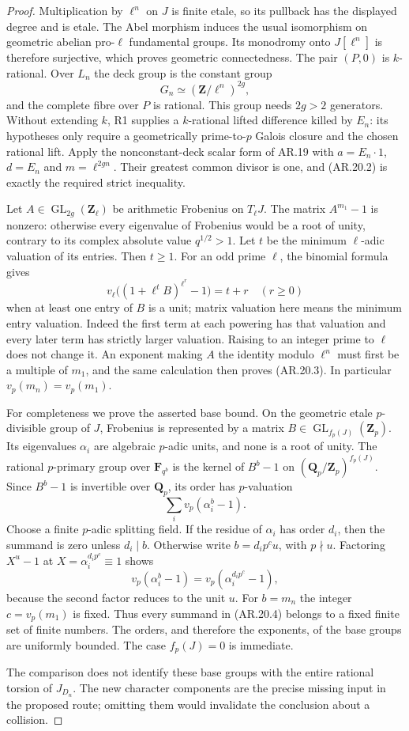\begin{proof}
Multiplication by $\ell^n$ on $J$ is finite etale,
so its pullback has the displayed degree and is etale.
The Abel morphism induces the usual isomorphism on
geometric abelian pro-$\ell$ fundamental groups.
Its monodromy onto $J[\ell^n]$ is therefore surjective,
which proves geometric connectedness. The pair $(P,0)$
is $k$-rational. Over $L_n$ the deck group is the
constant group
\[
                  G_n\simeq(\mathbf Z/\ell^n)^{2g},
\]
and the complete fibre over $P$ is rational. This
group needs $2g>2$ generators. Without extending $k$,
R1 supplies a $k$-rational lifted difference killed by
$E_n$: its hypotheses only require a geometrically
prime-to-$p$ Galois closure and the chosen rational
lift. Apply the nonconstant-deck scalar form of AR.19 with
$a=E_n\cdot1$, $d=E_n$ and $m=\ell^{2gn}$.
Their greatest common divisor is one, and (AR.20.2)
is exactly the required strict inequality.

Let $A\in\operatorname{GL}_{2g}(\mathbf Z_\ell)$
be arithmetic Frobenius on $T_\ell J$. The matrix
$A^{m_1}-1$ is nonzero: otherwise every eigenvalue
of Frobenius would be a root of unity, contrary
to its complex absolute value $q^{1/2}>1$.
Let $t$ be the minimum $\ell$-adic valuation of its
entries. Then $t\ge1$. For an odd prime $\ell$, the
binomial formula gives
\[
 v_\ell\bigl((1+\ell^t B)^{\ell^r}-1\bigr)=t+r
 \quad(r\ge0)
\]
when at least one entry of $B$ is a unit; matrix
valuation here means the minimum entry valuation.
Indeed the first term at each powering has that
valuation and every later term has strictly larger
valuation. Raising to an integer prime to $\ell$
does not change it. An exponent making $A$ the
identity modulo $\ell^n$ must first be a multiple
of $m_1$, and the same calculation then proves
(AR.20.3). In particular $v_p(m_n)=v_p(m_1)$.

For completeness we prove the asserted base bound.
On the geometric etale $p$-divisible group of $J$,
Frobenius is represented by a matrix
$B\in\operatorname{GL}_{f_p(J)}(\mathbf Z_p)$.
Its eigenvalues $\alpha_i$ are algebraic $p$-adic
units, and none is a root of unity. The rational
$p$-primary group over $\mathbf F_{q^b}$ is the
kernel of $B^b-1$ on $(\mathbf Q_p/\mathbf Z_p)^{f_p(J)}$.
Since $B^b-1$ is invertible over $\mathbf Q_p$,
its order has $p$-valuation
\[
                  \sum_i v_p(\alpha_i^b-1).             \tag{AR.20.4}
\]
Choose a finite $p$-adic splitting field. If the
residue of $\alpha_i$ has order $d_i$, then the
summand is zero unless $d_i\mid b$. Otherwise
write $b=d_i p^c u$, with $p\nmid u$. Factoring
$X^u-1$ at $X=\alpha_i^{d_i p^c}\equiv1$ shows
\[
 v_p(\alpha_i^b-1)=
 v_p(\alpha_i^{d_i p^c}-1),
\]
because the second factor reduces to the unit $u$.
For $b=m_n$ the integer $c=v_p(m_1)$ is fixed.
Thus every summand in (AR.20.4) belongs to a fixed
finite set of finite numbers. The orders, and
therefore the exponents, of the base groups are
uniformly bounded. The case $f_p(J)=0$ is immediate.

The comparison does not identify these base groups
with the entire rational torsion of $J_{D_n}$. The
new character components are the precise missing
input in the proposed route; omitting them would
invalidate the conclusion about a collision.
\end{proof}
